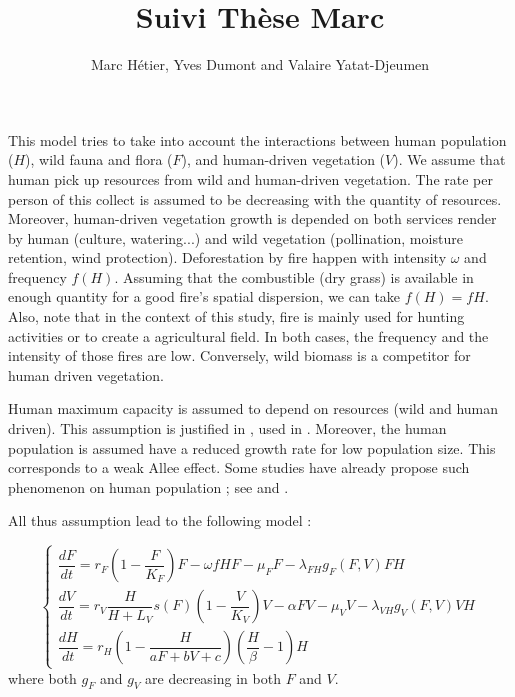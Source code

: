 \documentclass{article}
\title{Suivi Thèse Marc}
\author{Marc Hétier, Yves Dumont  and Valaire Yatat-Djeumen}
\begin{document}
\maketitle

This model tries to take into account the interactions between human population ($H$), wild fauna and flora ($F$), and human-driven vegetation ($V$). 
We assume that human pick up resources from wild and human-driven vegetation. The rate per person of this collect is assumed to be decreasing with the quantity of resources.
Moreover, human-driven vegetation growth is depended on both services render by human (culture, watering...) and wild vegetation (pollination, moisture retention, wind protection). 
Deforestation by fire happen with intensity $\omega$ and frequency $f(H)$. Assuming that the combustible (dry grass) is available in enough quantity for a good fire's spatial dispersion, we can take $f(H) = fH$. Also, note that in the context of this study, fire is mainly used for hunting activities or to create a agricultural field. In both cases, the frequency and the intensity of those fires are low.
Conversely, wild biomass is a competitor for human driven vegetation.

Human maximum capacity is assumed to depend on resources (wild and human driven). This assumption is justified in \cite{fanta_equilibrium_2018}, used in \cite{bengochea_paz_agricultural_2020}.
Moreover, the human population is assumed have a reduced growth rate for low population size. This corresponds to a weak Allee effect. Some studies have already propose such phenomenon on human population ; see \cite{hamilton_human_2012} and \cite{vaesen_inbreeding_2019}.

All thus assumption lead to the following model :

\begin{equation}    
\left\{ \begin{array}{l}
\dfrac{dF}{dt}=r_{F}\left(1-\dfrac{F}{K_{F}}\right)F-\omega f H F - \mu_F F -\lambda_{FH}g_F(F,V)F H \\
\dfrac{dV}{dt}=r_V \dfrac{H}{H + L_V} s(F) \left(1-\dfrac{V}{K_{V}}\right)V -\alpha FV-\mu_V V -\lambda_{VH} g_V(F,V) V H\\
\dfrac{dH}{dt}=r_H \left(1-\dfrac{H}{aF + bV + c} \right) (\dfrac{H}{\beta} - 1) H
\end{array}\right.
\label{model}
\end{equation}
where both $g_F$ and $g_V$ are decreasing in both $F$ and $V$.
\end{document}
